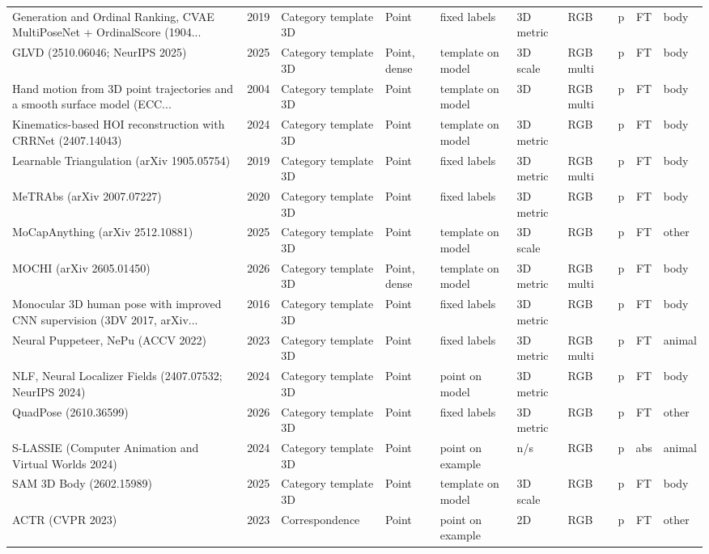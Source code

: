 {\begin{landscape}
\begin{longtable}{@{}p{4.6cm}rp{2.0cm}lllllcl@{}}
Generation and Ordinal Ranking, CVAE MultiPoseNet + OrdinalScore (1904... & 2019 & Category template 3D & Point & fixed labels & 3D metric & RGB & p & FT & body \\
GLVD (2510.06046; NeurIPS 2025) & 2025 & Category template 3D & Point, dense & template on model & 3D scale & RGB multi & p & FT & body \\
Hand motion from 3D point trajectories and a smooth surface model (ECC... & 2004 & Category template 3D & Point & template on model & 3D & RGB multi & p & FT & body \\
Kinematics-based HOI reconstruction with CRRNet (2407.14043) & 2024 & Category template 3D & Point & template on model & 3D metric & RGB & p & FT & body \\
Learnable Triangulation (arXiv 1905.05754) & 2019 & Category template 3D & Point & fixed labels & 3D metric & RGB multi & p & FT & body \\
MeTRAbs (arXiv 2007.07227) & 2020 & Category template 3D & Point & fixed labels & 3D metric & RGB & p & FT & body \\
MoCapAnything (arXiv 2512.10881) & 2025 & Category template 3D & Point & template on model & 3D scale & RGB & p & FT & other \\
MOCHI (arXiv 2605.01450) & 2026 & Category template 3D & Point, dense & template on model & 3D metric & RGB multi & p & FT & body \\
Monocular 3D human pose with improved CNN supervision (3DV 2017, arXiv... & 2016 & Category template 3D & Point & fixed labels & 3D metric & RGB & p & FT & body \\
Neural Puppeteer, NePu (ACCV 2022) & 2023 & Category template 3D & Point & fixed labels & 3D metric & RGB multi & p & FT & animal \\
NLF, Neural Localizer Fields (2407.07532; NeurIPS 2024) & 2024 & Category template 3D & Point & point on model & 3D metric & RGB & p & FT & body \\
QuadPose (2610.36599) & 2026 & Category template 3D & Point & fixed labels & 3D metric & RGB & p & FT & other \\
S-LASSIE (Computer Animation and Virtual Worlds 2024) & 2024 & Category template 3D & Point & point on example & n/s & RGB & p & abs & animal \\
SAM 3D Body (2602.15989) & 2025 & Category template 3D & Point & template on model & 3D scale & RGB & p & FT & body \\
ACTR (CVPR 2023) & 2023 & Correspondence & Point & point on example & 2D & RGB & p & FT & other \\

\end{longtable}
\end{landscape}}

